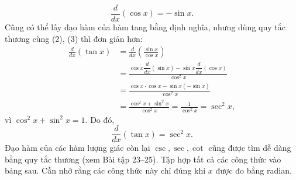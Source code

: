\documentclass[12pt,a4paper]{article}
\begin{document}
\[\frac{d}{dx}(\cos x)=-\sin x.\tag{3}\]
Cũng có thể lấy đạo hàm của hàm tang bằng định nghĩa, nhưng dùng quy tắc thương cùng (2), (3) thì đơn giản hơn:
\begin{align*}
\frac{d}{dx}(\tan x)&=\frac{d}{dx}\left(\frac{\sin x}{\cos x}\right)\\
&=\frac{\cos x\dfrac{d}{dx}(\sin x)-\sin x\dfrac{d}{dx}(\cos x)}{\cos^2x}\\
&=\frac{\cos x\cdot\cos x-\sin x(-\sin x)}{\cos^2x}\\
&=\frac{\cos^2x+\sin^2x}{\cos^2x}=\frac1{\cos^2x}=\sec^2x,
\end{align*}
vì $\cos^2x+\sin^2x=1$. Do đó,
\[\frac{d}{dx}(\tan x)=\sec^2x.\tag{4}\]
Đạo hàm của các hàm lượng giác còn lại $\csc,\sec,\cot$ cũng được tìm dễ dàng bằng quy tắc thương (xem Bài tập 23–25). Tập hợp tất cả các công thức vào bảng sau. Cần nhớ rằng các công thức này chỉ đúng khi $x$ được đo bằng radian.
\end{document}
